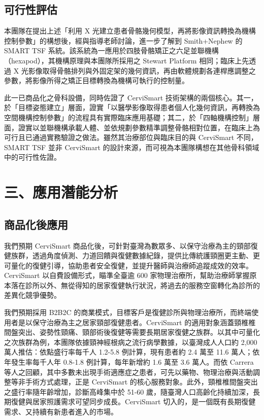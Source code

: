 \documentclass[12pt,a4paper]{article}
\begin{document}
\subsection{可行性評估}

本團隊在提出上述「利用 X 光建立患者骨骼幾何模型，再將影像資訊轉換為機構控制參數」的構想後，經與指導老師討論，進一步了解到 Smith+Nephew 的 SMART TSF 系統\cite{smith-nephew2022}。該系統為一應用於四肢骨骼矯正之六足並聯機構（hexapod），其機構原理與本團隊所採用之 Stewart Platform 相同；臨床上先透過 X 光影像取得骨骼排列與外固定架的幾何資訊，再由軟體規劃各連桿應調整之參數，將影像所得之矯正目標轉換為機構可執行的控制量。

此一已商品化之骨科設備，同時佐證了 CerviSmart 技術架構的兩個核心。其一，於「目標姿態建立」層面，證實「以醫學影像取得患者個人化幾何資訊，再轉換為空間機構控制參數」的流程具有實際臨床應用基礎；其二，於「四軸機構控制」層面，證實以並聯機構承載人體、並依規劃參數精準調整骨骼相對位置，在臨床上為可行且已通過實務驗證之做法。雖然其治療部位與臨床目的與 CerviSmart 不同，SMART TSF 並非 CerviSmart 的設計來源，而可視為本團隊構想在其他骨科領域中的可行性佐證。

\section{三、應用潛能分析}

\subsection{商品化後應用}

我們預期 CerviSmart 商品化後，可針對臺灣為數眾多、以保守治療為主的頸部復健族群，透過角度偵測、力道回饋與復健數據紀錄，提供比傳統護頸圈更主動、更可量化的復健引導，協助患者安全復健，並提升醫師與治療師追蹤成效的效率。CerviSmart 以自費設備形式，瞄準全臺逾 600 家物理治療所，幫助治療師掌握原本落在診所以外、無從得知的居家復健執行狀況，將過去的服務空窗轉化為診所的差異化競爭優勢。

我們預期採用 B2B2C 的商業模式，目標客戶是復健診所與物理治療所，而終端使用者是以保守治療為主之居家頸部復健患者。CerviSmart 的適用對象涵蓋頸椎椎間盤突出、姿勢性頸痛、頸部術後復健等需要長期居家復健之族群。以其中可量化之次族群為例，本團隊依據頸神經根病之流行病學數據\cite{mansfield2020}，以臺灣成人人口約 2,000 萬人推估：依點盛行率每千人 1.2-5.8 例計算，現有患者約 2.4 萬至 11.6 萬人；依年發生率每千人年 0.8-1.8 例計算，每年新增約 1.6 萬至 3.6 萬人。而依 Carrera 等人之回顧，其中多數未出現手術適應症之患者，可先以藥物、物理治療與活動調整等非手術方式處理\cite{carrera2026}，正是 CerviSmart 的核心服務對象。此外，頸椎椎間盤突出之盛行率隨年齡增加，診斷高峰集中於 51-60 歲\cite{carrera2026}，隨臺灣人口高齡化持續加深，長期復健與居家照護需求可望同步成長。CerviSmart 切入的，是一個既有長期復健需求、又持續有新患者進入的市場。
\end{document}
